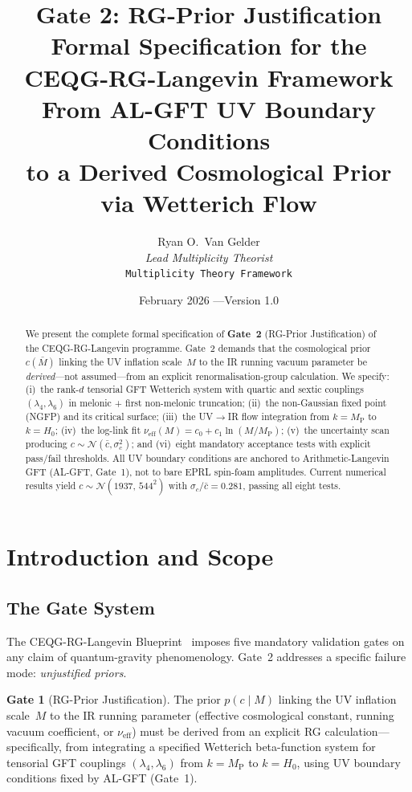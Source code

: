 \documentclass[11pt,a4paper]{article}
\title{
  \textbf{Gate 2: RG-Prior Justification} \\[6pt]
  \large Formal Specification for the CEQG-RG-Langevin Framework \\[4pt]
  \normalsize From AL-GFT UV Boundary Conditions \\
  to a Derived Cosmological Prior via Wetterich Flow
}
\author{
  Ryan O.\ Van Gelder \\
  \textit{Lead Multiplicity Theorist} \\
  \texttt{Multiplicity Theory Framework}
}
\date{February 2026 \quad---\quad Version 1.0}
\theoremstyle{definition}
\newtheorem{gate}{Gate}
\theoremstyle{plain}
\theoremstyle{remark}
\newcommand{\MP}{M_{\mathrm{P}}}
\newcommand{\Hzero}{H_0}
\newcommand{\nueff}{\nu_{\mathrm{eff}}}
\begin{document}
\maketitle

\begin{abstract}
We present the complete formal specification of \textbf{Gate~2}
(RG-Prior Justification) of the CEQG-RG-Langevin programme.
Gate~2 demands that the cosmological prior $c(\bar{M})$ linking the UV
inflation scale~$M$ to the IR running vacuum parameter be
\emph{derived}---not assumed---from an explicit renormalisation-group
calculation.  We specify:
(i)~the rank-$d$ tensorial GFT Wetterich system with quartic and sextic
couplings $(\lambda_4,\lambda_6)$ in melonic + first non-melonic truncation;
(ii)~the non-Gaussian fixed point (NGFP) and its critical surface;
(iii)~the UV$\to$IR flow integration from $k=\MP$ to $k=\Hzero$;
(iv)~the log-link fit $\nueff(M) = c_0 + c_1\ln(M/\MP)$;
(v)~the uncertainty scan producing $c\sim\mathcal{N}(\bar{c},\sigma_c^2)$;
and (vi)~eight mandatory acceptance tests with explicit pass/fail
thresholds.  All UV boundary conditions are anchored to
Arithmetic-Langevin GFT (AL-GFT, Gate~1), not to bare EPRL spin-foam
amplitudes.  Current numerical results yield
$c\sim\mathcal{N}(1937,\,544^2)$ with $\sigma_c/\bar{c}=0.281$,
passing all eight tests.
\end{abstract}

\tableofcontents
\newpage

\section{Introduction and Scope}
\label{sec:intro}

\subsection{The Gate System}

The CEQG-RG-Langevin Blueprint~\cite{blueprint} imposes five mandatory
validation gates on any claim of quantum-gravity phenomenology.
Gate~2 addresses a specific failure mode: \emph{unjustified priors}.

\begin{gate}[RG-Prior Justification]
\label{gate:2}
The prior $p(c\!\mid\!M)$ linking the UV inflation scale~$M$ to the IR
running parameter (effective cosmological constant, running vacuum
coefficient, or $\nueff$) must be derived from an explicit RG
calculation---specifically, from integrating a specified Wetterich
beta-function system for tensorial GFT couplings
$(\lambda_4,\lambda_6)$ from $k=\MP$ to $k=\Hzero$, using UV boundary
conditions fixed by AL-GFT (Gate~1).
\end{gate}
\end{document}
